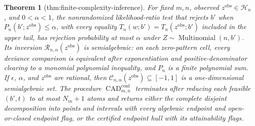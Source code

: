 \documentclass{article}
\newtheorem{theorem}{Theorem}
\begin{document}
\begin{theorem}[thm:finite-complexity-inference]\label{thm:finite-complexity-inference}
For fixed \(m,n\), observed \(z^{\mathrm{obs}}\in\mathcal H_n\), and \(0<\alpha<1\), the nonrandomized likelihood-ratio test that rejects \(b'\) when \(P_n(b';z^{\mathrm{obs}})\le\alpha\), with every equality \(T_n(w;b')=T_n(z^{\mathrm{obs}};b')\) included in the upper tail, has rejection probability at most \(\alpha\) under \(Z\sim\operatorname{Multinomial}(n,b')\). Its inversion \(\mathcal R_{n,\alpha}(z^{\mathrm{obs}})\) is semialgebraic: on each zero-pattern cell, every deviance comparison is equivalent after exponentiation and positive-denominator clearing to a monomial polynomial inequality, and \(P_n\) is a finite polynomial sum. If \(\epsilon\), \(\alpha\), and \(z^{\mathrm{obs}}\) are rational, then \(\mathcal C_{n,\alpha}(z^{\mathrm{obs}})\subseteq[-1,1]\) is a one-dimensional semialgebraic set. The procedure \(\operatorname{CAD}^{\mathrm{conf}}_{m,n}\) terminates after reducing each feasible \((b',t)\) to at most \(N_m+1\) atoms and returns either the complete disjoint decomposition into points and intervals with every algebraic endpoint and open-or-closed endpoint flag, or the certified endpoint hull with its attainability flags.
\end{theorem}
\end{document}
